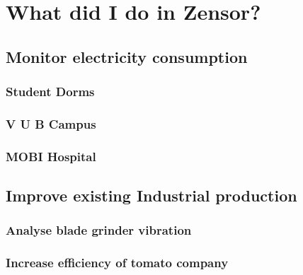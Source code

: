 \chapter{What did I do in Zensor?}

\section{Monitor electricity consumption}
\subsection{Student Dorms}
\subsection{V U B Campus}
\subsection{MOBI Hospital}

\section{Improve existing Industrial production}
\subsection{Analyse blade grinder vibration}
\cite{Misc:stumabo_en_website}
% 

\subsection{Increase efficiency of tomato company}
\cite{Misc:stoffels_en_website}


